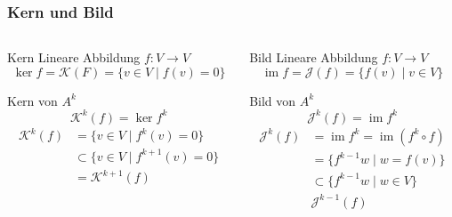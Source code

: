 %
%
%
\begin{frame}[t]
\setlength{\abovedisplayskip}{5pt}
\setlength{\belowdisplayskip}{5pt}
\frametitle{Kern und Bild}
\vspace{-15pt}
\begin{columns}[t,onlytextwidth]
\begin{column}{0.48\textwidth}
\begin{block}{Kern}
Lineare Abbildung $f\colon V\to V$
\[
\ker f = \mathcal{K}(F) = \{v\in V\;|\; f(v)=0\}
\]
\end{block}
\begin{block}{Kern von $A^k$}
\[
\mathcal{K}^k(f) = \operatorname{ker} f^k
\]
\begin{align*}
\mathcal{K}^k(f)
&=
\{v\in V\;|\; f^{k}(v)=0\}
\\
&\subset
\{v\in V\;|\; f^{k+1}(v)=0\}
\\
&=\mathcal{K}^{k+1}(f)
\end{align*}
\end{block}
\end{column}
\begin{column}{0.48\textwidth}
\begin{block}{Bild}
Lineare Abbildung $f\colon V\to V$
\[
\operatorname{im}f
=
\mathcal{J}(f)
=
\{f(v)\;|\; v\in V\}
\]
\end{block}
\begin{block}{Bild von $A^k$}
\[
\mathcal{J}^k(f) = \operatorname{im}f^k
\]
\begin{align*}
\mathcal{J}^k(f)
&=
\operatorname{im}f^k
=
\operatorname{im}(f^{k}\circ f)
\\
&=
\{f^{k-1} w\;|\; w = f(v)\}
\\
&\subset
\{f^{k-1} w\;|\; w \in V\}
\\
&\mathcal{J}^{k-1}(f)
\end{align*}
\end{block}
\end{column}
\end{columns}
\end{frame}
